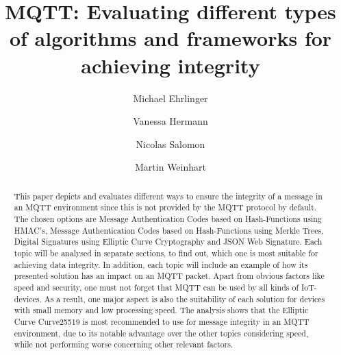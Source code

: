 \documentclass[runningheads]{llncs}
\begin{document}
\title{MQTT: Evaluating different types of algorithms and frameworks for achieving integrity}


\author{Michael Ehrlinger \and Vanessa Hermann \and Nicolas Salomon \and Martin Weinhart}



\maketitle


\begin{abstract}
This paper depicts and evaluates different ways to ensure the integrity of a message in an MQTT environment since this is not provided by the MQTT protocol by default. 
The chosen options are Message Authentication Codes based on Hash-Functions using HMAC's, Message Authentication Codes based on Hash-Functions using Merkle Trees, Digital Signatures using Elliptic Curve Cryptography and JSON Web Signature. 
Each topic will be analysed in separate sections, to find out, which one is most suitable for achieving data integrity. 
In addition, each topic will include an example of how its presented solution has an impact on an MQTT packet. 
Apart from obvious factors like speed and security, one must not forget that MQTT can be used by all kinds of IoT-devices. 
As a result, one major aspect is also the suitability of each solution for devices with small memory and low processing speed. 
The analysis shows that the Elliptic Curve Curve25519 is most recommended to use for message integrity in an MQTT environment, due to its notable advantage over the other topics considering speed, while not performing worse concerning other relevant factors.
\newline

\end{abstract}



\newpage








%
%
\newpage


%
\end{document}
